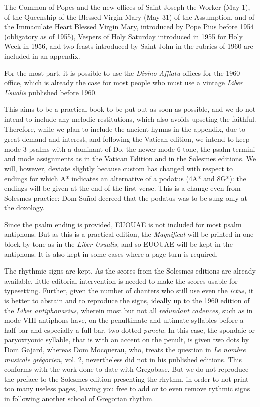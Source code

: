 \begin{enpars}
The Common of Popes and the new offices of Saint Joseph the Worker (May 1), of the Queenship of the Blessed Virgin Mary (May 31) of the Assumption, and of the Immaculate Heart Blessed Virgin Mary, introduced by Pope Pius  before 1954 (obligatory as of 1955), Vespers of Holy Saturday introduced in 1955 for Holy Week in 1956, and two feasts introduced by Saint John  in the rubrics of 1960 are included in an appendix.

For the most part, it is possible to use the \textit{Divino Afflatu} offices for the 1960 office, which is already the case for most people who must use a vintage \textit{Liber Usualis} published before 1960.

This aims to be a practical book to be put out as soon as possible, and we do not intend to include any melodic restitutions, which also avoids upseting the faithful. Therefore, while we plan to include the ancient hymns in the appendix, due to great demand and interest, and following the Vatican edition, we intend to keep mode 3 psalms with a dominant of Do, the newer mode 6 tone, the psalm termini and mode assignments as in the Vatican Edition and in the Solesmes editions. We will, however, deviate slightly because custom has changed with respect to endings for which A* indicates an alternative of a podatus (4A* and 8G*): the endings will be given at the end of the first verse. This is a change even from Solesmes practice: Dom Suñol decreed that the podatus was to be sung only at the doxology.

Since the psalm ending is provided, EUOUAE is not included for most psalm antiphons. But as this is a practical edition, the \textit{Magnificat} will be printed in one block by tone as in the \textit{Liber Usualis,} and so EUOUAE will be kept in the antiphons. It is also kept in some cases where a page turn is required.


The rhythmic signs are kept. As the scores from the Solesmes editions are already available, little editorial intervention is needed to make the scores usable for typesetting. Further, given the number of chanters who still use even the \textit{ictus,}  it is better to abstain and to reproduce the signs, ideally up to the 1960 edition of the \textit{Liber antiphonarius,} wherein most but not all \textit{redundant cadences,} such as in mode VIII antiphons have, on the penultimate and ultimate syllables before a half bar and especially a full bar, two dotted \textit{puncta}. In this case, the spondaic or paryoxtyonic syllable, that is with an accent on the penult, is given two dots by Dom Gajard, whereas Dom Mocquerau, who, treats the question in \textit{Le nombre musicale grégorien,} vol. 2, nevertheless did not in his published editions. This conforms with the work done to date with Gregobase. But we do not reproduce the preface to the Solesmes edition presenting the rhythm, in order to not print too many useless pages, leaving you free to add or to even remove rythmic signs in following another school of Gregorian rhythm.


\end{enpars}
